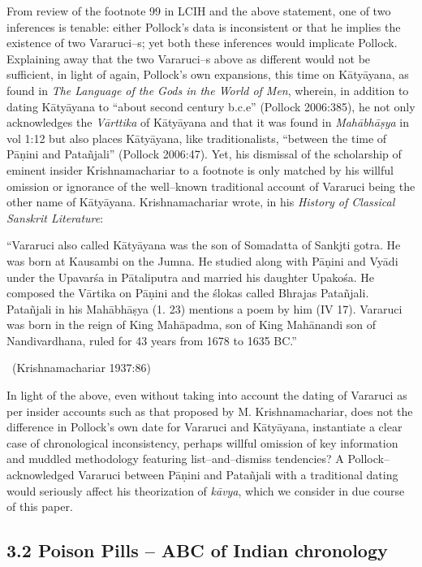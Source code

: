 From review of the footnote 99 in LCIH and the above statement, one of two inferences is tenable: either Pollock’s data is inconsistent or that he implies the existence of two Vararuci–s; yet both these inferences would implicate Pollock. Explaining away that the two Vararuci–s above as different would not be sufficient, in light of again, Pollock’s own expansions, this time on Kātyāyana, as found in \textit{The Language of the Gods in the World of Men}, wherein, in addition to dating Kātyāyana to “about second century b.c.e” (Pollock 2006:385), he not only acknowledges the \textit{Vārttika} of Kātyāyana and that it was found in \textit{Mahābhāṣya} in vol 1:12 but also places Kātyāyana, like traditionalists, “between the time of Pāṇini and Patañjali” (Pollock 2006:47). Yet, his dismissal of the scholarship of eminent insider Krishnamachariar to a footnote is only matched by his willful omission or ignorance of the well–known traditional account of Vararuci being the other name of Kātyāyana. Krishnamachariar wrote, in his \textit{History of Classical Sanskrit Literature}:

\begin{myquote}
“Vararuci also called Kātyāyana was the son of Somadatta of Sankjti gotra. He was born at Kausambi on the Jumna. He studied along with Pāṇini and Vyādi under the Upavarśa in Pātaliputra and married his daughter Upakośa. He composed the Vārtika on Pāṇini and the ślokas called Bhrajas Patañjali. Patañjali in his Mahābhāṣya (1. 23) mentions a poem by him (IV 17). Vararuci was born in the reign of King Mahāpadma, son of King Mahānandi son of Nandivardhana, ruled for 43 years from 1678 to 1635 BC.” 

~\hfill (Krishnamachariar 1937:86)
\end{myquote}

In light of the above, even without taking into account the dating of Vararuci as per insider accounts such as that proposed by M. Krishnamachariar, does not the difference in Pollock’s own date for Vararuci and Kātyāyana, instantiate a clear case of chronological inconsistency, perhaps willful omission of key information and muddled methodology featuring list–and–dismiss tendencies? A Pollock–acknowledged Vararuci between Pāṇini and Patañjali with a traditional dating would seriously affect his theorization of \textit{kāvya}, which we consider in due course of this paper.


\subsection*{3.2 Poison Pills – ABC of Indian chronology}


